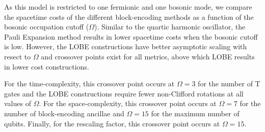 As this model is restricted to one fermionic and one bosonic mode, we compare the spacetime costs of the different block-encoding methods as a function of the bosonic occupation cutoff ($\Omega$).
Similar to the quartic harmonic oscillator, the Pauli Expansion method results in lower spacetime costs when the bosonic cutoff is low.
However, the LOBE constructions have better asymptotic scaling with resect to $\Omega$ and crossover points exist for all metrics, above which LOBE results in lower cost constructions.

For the time-complexity, this crossover point occurs at $\Omega = 3$ for the number of T gates and the LOBE constructions require fewer non-Clifford rotations at all values of $\Omega$.
For the space-complexity, this crossover point occurs at $\Omega = 7$ for the number of block-encoding ancillae and $\Omega = 15$ for the maximum number of qubits.
Finally, for the rescaling factor, this crossover point occurs at $\Omega = 15$.